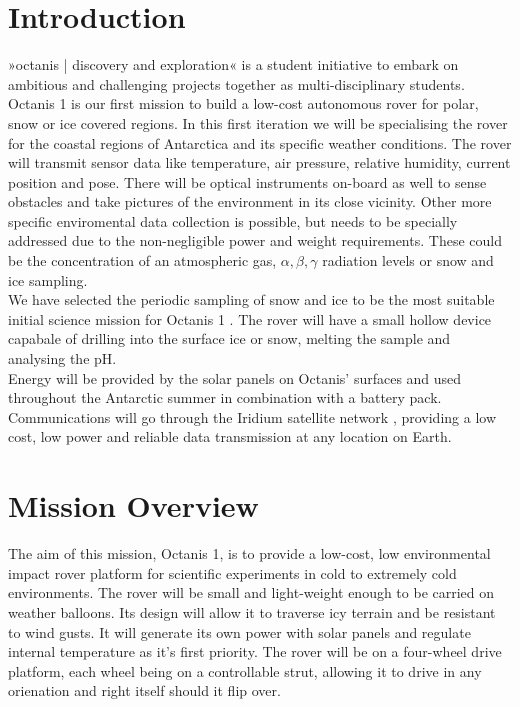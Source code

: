 \documentclass[a4paper,12pt]{article}
\begin{document}
\tableofcontents

\pagebreak

\section{Introduction}
»octanis | discovery and exploration« \cite{octanis} is a student initiative to embark on ambitious and challenging projects together as multi-disciplinary students. Octanis 1 is our first mission to build a low-cost autonomous rover for polar, snow or ice covered regions. In this first iteration we will be specialising the rover for the coastal regions of Antarctica and its specific weather conditions. The rover will transmit sensor data like temperature, air pressure, relative humidity, current position and pose. There will be optical instruments on-board as well to sense obstacles and take pictures of the environment in its close vicinity. Other more specific enviromental data collection is possible, but needs to be specially addressed due to the non-negligible power and weight requirements. These could be the concentration of an atmospheric gas, $\alpha, \beta, \gamma$ radiation levels or snow and ice sampling. \\ We have selected the periodic sampling of snow and ice to be the most suitable initial science mission for Octanis 1 \cite{krishnakant}. The rover will have a small hollow device capabale of drilling into the surface ice or snow, melting the sample and analysing the pH.
\\ Energy will be provided by the solar panels on Octanis' surfaces and used throughout the Antarctic summer in combination with a battery pack. Communications will go through the Iridium satellite network \cite{iridium}, providing a low cost, low power and reliable data transmission at any location on Earth. 



\section{Mission Overview}

The aim of this mission, Octanis 1, is to provide a low-cost, low environmental impact rover platform for scientific experiments in cold to extremely cold environments. The rover will be small and light-weight enough to be carried on weather balloons. Its design will allow it to traverse icy terrain and be resistant to wind gusts. It will generate its own power with solar panels and regulate internal temperature as it's first priority. The rover will be on a four-wheel drive platform, each wheel being on a controllable strut, allowing it to drive in any orienation and right itself should it flip over. 
\end{document}

